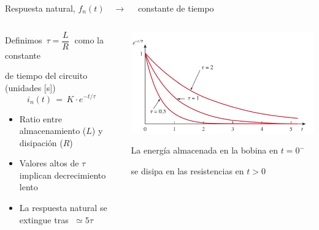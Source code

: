 \documentclass[aspectratio=169, usenames,svgnames,dvipsnames]{beamer}
\begin{document}
\begin{frame}{Respuesta natural, \hspace{3mm}$f_n(t) \quad\rightarrow\quad$ constante de tiempo}
    \begin{columns}
    \begin{column}{0.42\linewidth}
        Definimos \(\, \tau = \dfrac{L}{R} \;\) como la \alert{constante} 

        \vspace{2mm}
        \alert{de tiempo} del circuito (unidades [s])    
        \[
          \boxed{\; i_n(t) \,=\, K \cdot e^{-t/\tau} \;}
        \]
        
        \begin{itemize}
            \item Ratio entre \alert{almacenamiento} (\(L\)) y \alert{disipación} (\(R\))
    
            \vspace{3mm}
            \item Valores altos de \(\tau\) implican decrecimiento lento
    
            \vspace{3mm}
            \item La respuesta natural \alert{se extingue} tras \(\; \simeq 5\tau\)
        \end{itemize}
    \end{column}
    \begin{column}{0.58\linewidth}
        \vspace{2mm}
        \begin{center}
            \includegraphics[height=0.6\textheight]{../figs/constante_tiempo.pdf}
        \end{center}

        \hspace{5mm}La \alert{energía almacenada} en la bobina en $t=0^-$ 
        
        \hspace{5mm}se \alert{disipa en las resistencias} en $t>0$
    \end{column}
    \end{columns}
\end{frame}
\end{document}
